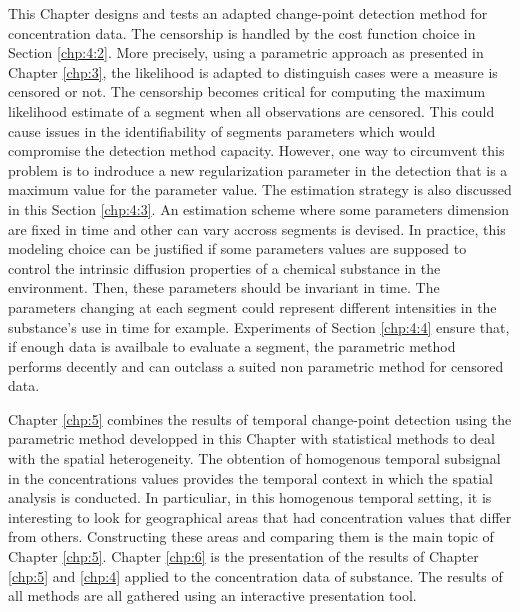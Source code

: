 This Chapter designs and tests an adapted change-point detection method for concentration data. The censorship is handled by the cost function choice in Section \ref{chp:4:2}. More precisely, using a parametric approach as presented in Chapter \ref{chp:3}, the likelihood is adapted to distinguish cases were a measure is censored or not. The censorship becomes critical for computing the maximum likelihood estimate of a segment when all observations are censored. This could cause issues in the identifiability of segments parameters which would compromise the detection method capacity. However, one way to circumvent this problem is to indroduce a new regularization parameter in the detection that is a maximum value for the parameter value. The estimation strategy is also discussed in this Section \ref{chp:4:3}. An estimation scheme where some parameters dimension are fixed in time and other can vary accross segments is devised. In practice, this modeling choice can be justified if some parameters values are supposed to control the intrinsic diffusion properties of a chemical substance in the environment. Then, these parameters should be invariant in time. The parameters changing at each segment could represent different intensities in the substance's use in time for example. Experiments of Section \ref{chp:4:4} ensure that, if enough data is availbale to evaluate a segment, the parametric method performs decently and can outclass a suited non parametric method for censored data. 

Chapter \ref{chp:5} combines the results of temporal change-point detection using the parametric method developped in this Chapter with statistical methods to deal with the spatial heterogeneity. The obtention of homogenous temporal subsignal in the concentrations values provides the temporal context in which the spatial analysis is conducted. In particuliar, in this homogenous temporal setting, it is interesting to look for geographical areas that had concentration values that differ from others. Constructing these areas and comparing them is the main topic of Chapter \ref{chp:5}. Chapter \ref{chp:6} is the presentation of the results of Chapter \ref{chp:5} and \ref{chp:4} applied to the concentration data of substance. The results of all methods are all gathered using an interactive presentation tool.     

       

 